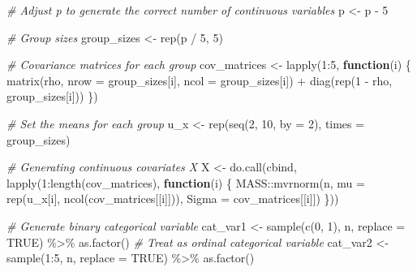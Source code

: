 \documentclass[
  11pt,
]{article}
\newenvironment{Shaded}{}{}
\newcommand{\AttributeTok}[1]{\textcolor[rgb]{0.49,0.56,0.16}{#1}}
\newcommand{\CommentTok}[1]{\textcolor[rgb]{0.38,0.63,0.69}{\textit{#1}}}
\newcommand{\ConstantTok}[1]{\textcolor[rgb]{0.53,0.00,0.00}{#1}}
\newcommand{\ControlFlowTok}[1]{\textcolor[rgb]{0.00,0.44,0.13}{\textbf{#1}}}
\newcommand{\DecValTok}[1]{\textcolor[rgb]{0.25,0.63,0.44}{#1}}
\newcommand{\FunctionTok}[1]{\textcolor[rgb]{0.02,0.16,0.49}{#1}}
\newcommand{\NormalTok}[1]{#1}
\newcommand{\OtherTok}[1]{\textcolor[rgb]{0.00,0.44,0.13}{#1}}
\newcommand{\SpecialCharTok}[1]{\textcolor[rgb]{0.25,0.44,0.63}{#1}}
\begin{document}
\begin{Shaded}
\begin{Highlighting}[]
  \CommentTok{\# Adjust p to generate the correct number of continuous variables}
\NormalTok{  p }\OtherTok{\textless{}{-}}\NormalTok{ p }\SpecialCharTok{{-}} \DecValTok{5}
  
  \CommentTok{\# Group sizes}
\NormalTok{  group\_sizes }\OtherTok{\textless{}{-}} \FunctionTok{rep}\NormalTok{(p }\SpecialCharTok{/} \DecValTok{5}\NormalTok{, }\DecValTok{5}\NormalTok{)}
  
  \CommentTok{\# Covariance matrices for each group}
\NormalTok{  cov\_matrices }\OtherTok{\textless{}{-}} \FunctionTok{lapply}\NormalTok{(}\DecValTok{1}\SpecialCharTok{:}\DecValTok{5}\NormalTok{, }\ControlFlowTok{function}\NormalTok{(i) \{}
    \FunctionTok{matrix}\NormalTok{(rho, }\AttributeTok{nrow =}\NormalTok{ group\_sizes[i], }\AttributeTok{ncol =}\NormalTok{ group\_sizes[i]) }\SpecialCharTok{+}
      \FunctionTok{diag}\NormalTok{(}\FunctionTok{rep}\NormalTok{(}\DecValTok{1} \SpecialCharTok{{-}}\NormalTok{ rho, group\_sizes[i]))}
\NormalTok{  \})}
  
  \CommentTok{\# Set the means for each group}
\NormalTok{  u\_x }\OtherTok{\textless{}{-}} \FunctionTok{rep}\NormalTok{(}\FunctionTok{seq}\NormalTok{(}\DecValTok{2}\NormalTok{, }\DecValTok{10}\NormalTok{, }\AttributeTok{by =} \DecValTok{2}\NormalTok{), }\AttributeTok{times =}\NormalTok{ group\_sizes)}
  
  \CommentTok{\# Generating continuous covariates X}
\NormalTok{  X }\OtherTok{\textless{}{-}} \FunctionTok{do.call}\NormalTok{(cbind, }\FunctionTok{lapply}\NormalTok{(}\DecValTok{1}\SpecialCharTok{:}\FunctionTok{length}\NormalTok{(cov\_matrices), }\ControlFlowTok{function}\NormalTok{(i) \{}
\NormalTok{    MASS}\SpecialCharTok{::}\FunctionTok{mvrnorm}\NormalTok{(n, }\AttributeTok{mu =} \FunctionTok{rep}\NormalTok{(u\_x[i], }\FunctionTok{ncol}\NormalTok{(cov\_matrices[[i]])), }\AttributeTok{Sigma =}\NormalTok{ cov\_matrices[[i]])}
\NormalTok{  \}))}
  
  \CommentTok{\# Generate binary categorical variable}
\NormalTok{  cat\_var1 }\OtherTok{\textless{}{-}} \FunctionTok{sample}\NormalTok{(}\FunctionTok{c}\NormalTok{(}\DecValTok{0}\NormalTok{, }\DecValTok{1}\NormalTok{), n, }\AttributeTok{replace =} \ConstantTok{TRUE}\NormalTok{) }\SpecialCharTok{\%\textgreater{}\%} 
    \FunctionTok{as.factor}\NormalTok{()}
  \CommentTok{\# Treat as ordinal categorical variable}
\NormalTok{  cat\_var2 }\OtherTok{\textless{}{-}} \FunctionTok{sample}\NormalTok{(}\DecValTok{1}\SpecialCharTok{:}\DecValTok{5}\NormalTok{, n, }\AttributeTok{replace =} \ConstantTok{TRUE}\NormalTok{) }\SpecialCharTok{\%\textgreater{}\%} 
    \FunctionTok{as.factor}\NormalTok{()}
  

\end{Highlighting}
\end{Shaded}
\end{document}

